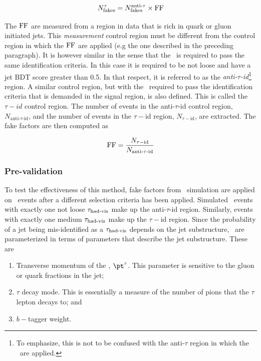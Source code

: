 \begin{equation}
N^\tau_{\text{fakes}} = N^{\text{anti-}\tau}_{\text{fakes}}\times\text{FF}
\label{eq:ffDef}
\end{equation}

\par The $\text{FF}$ are measured from a region in data that is rich in quark or gluon initiated jets. This {\it 
measurement} control region must be different from the control region in which the $\text{FF}$ are applied (e.g the 
one described in the preceding paragraph). It is however similar in the sense that the \tauvis\ is required 
to pass the same identification criteria. In this case it is required to be not loose and have 
a jet BDT score greater than 0.5. In that respect, it is referred to as the {\it anti-$\tau$-id}\footnote{To 
emphasize, this is not to be confused with the anti-$\tau$ region in which the \FF\ are applied.} region. 
A similar control region, but with the \tauvis\ required to pass the identification criteria that is 
demanded in the signal region, is also defined. This is called the $\tau-id$ control region.  
The number of events in the anti-$\tau$-id control region, $N_{\text{anti-}\tau\text{-id}}$, 
and the number of events in the $\tau-$id region, 
$N_{\tau-\text{id}}$, are extracted. The fake factors are then computed as 

\begin{equation}
\text{FF} = \frac{N_{\tau-\text{id}}}{N_{\text{anti-}\tau\text{-id}}} 
\end{equation}

\subsubsection{Pre-validation}
\par To test the effectiveness of this method, fake factors from \ttbar\ simulation are applied 
on \ttbar\ events after a different selection criteria has been applied. 
Simulated \ttbar\ events with exactly one not loose $\tau_{\text{had-vis}}$ make up the anti-$\tau$-id 
region. Similarly, events with exactly one medium $\tau_{\text{had-vis}}$ make up the $\tau-$id region.
Since the probability of a jet being mis-identified as a $\tau_{\text{had-vis}}$ depends on the jet substructure, \FF\ 
are parameterized in terms of parameters that describe the jet substructure. These are 
\begin{enumerate}
\item Transverse momentum of the \tauvis, $\pt^\tau$. This parameter is sensitive to the 
gluon or quark fractions in the jet;
\item $\tau$ decay mode. This is essentially a measure of the number of pions that the $\tau$ 
lepton decays to; and 
\item $b-$tagger weight. 
\end{enumerate}    

